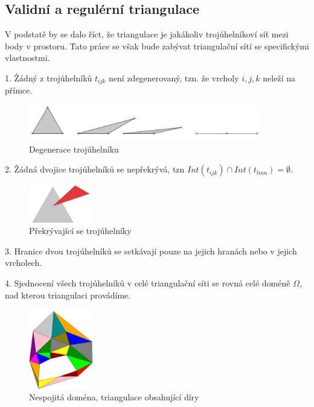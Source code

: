 \documentclass[12pt,a4paper]{article}
\begin{document}
\newpage
\subsection{Validní a regulérní triangulace}
V podstatě by se dalo říct, že triangulace je jakákoliv trojúhelníkoví síť mezi body v prostoru. Tato práce se však bude zabývat triangulační sítí se specifickými vlastnostmi.

1. Žádný z trojúhelníků $t_{ijk}$ není zdegenerovaný, tzn. že vrcholy $i, j, k$ neleží na přímce.
\begin{figure}[h!]
\centering
\includegraphics[width=0.9\textwidth]{img/podm_1.png}
\caption{Degenerace trojúhelníku}
\label{fig:podm_1}
\end{figure}

2. Žádná dvojice trojúhelníků se nepřekrývá, tzn $Int(t_{ijk}) \cap Int(t_{lmn}) = \emptyset$.
\begin{figure}[h!]
\centering
\includegraphics[width=0.25\textwidth]{img/podm_2.png}
\caption{Překrývající se trojúhelníky}
\label{fig:podm_2}
\end{figure}

3. Hranice dvou trojúhelníků se setkávají pouze na jejich hranách nebo v jejich vrcholech.

4. Sjednocení všech trojúhelníků v celé triangulační síti se rovná celé doméně $\Omega$, nad kterou triangulaci provádíme.
\begin{figure}[h!]
\centering
\includegraphics[width=0.25\textwidth]{img/podm_domena.png}
\caption{Nespojitá doména, triangulace obsahující díry}
\label{fig:podm_domena}
\end{figure}
\end{document}
